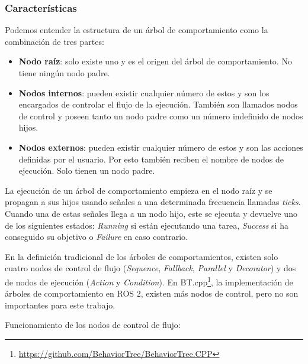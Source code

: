 \subsubsection{Características}

Podemos entender la estructura de un árbol de comportamiento como la combinación de tres partes:

\begin{itemize}
    \item \textbf{Nodo raíz}: solo existe uno y es el origen del árbol de comportamiento. No tiene ningún nodo padre.
    \item \textbf{Nodos internos}: pueden existir cualquier número de estos y son los encargados de controlar el flujo de la ejecución. También son llamados nodos de control y poseen tanto un nodo padre como un número indefinido de nodos hijos.
    \item \textbf{Nodos externos}: pueden existir cualquier número de estos y son las acciones definidas por el usuario. Por esto también reciben el nombre de nodos de ejecución. Solo tienen un nodo padre.
\end{itemize}

La ejecución de un árbol de comportamiento empieza en el nodo raíz y se propagan a sus hijos usando señales a una determinada frecuencia llamadas \textit{ticks}. Cuando una de estas señales llega a un nodo hijo, este se ejecuta y devuelve uno de los siguientes estados: \textit{Running} si están ejecutando una tarea, \textit{Success} si ha conseguido su objetivo o \textit{Failure} en caso contrario. 

En la definición tradicional de los árboles de comportamientos, existen solo cuatro nodos de control de flujo (\textit{Sequence}, \textit{Fallback}, \textit{Parallel} y \textit{Decorator}) y dos de nodos de ejecución (\textit{Action} y \textit{Condition}). En BT.cpp\footnote{\url{https://github.com/BehaviorTree/BehaviorTree.CPP}}, la implementación de árboles de comportamiento en ROS 2, existen más nodos de control, pero no son importantes para este trabajo.

\noindent Funcionamiento de los nodos de control de flujo:

